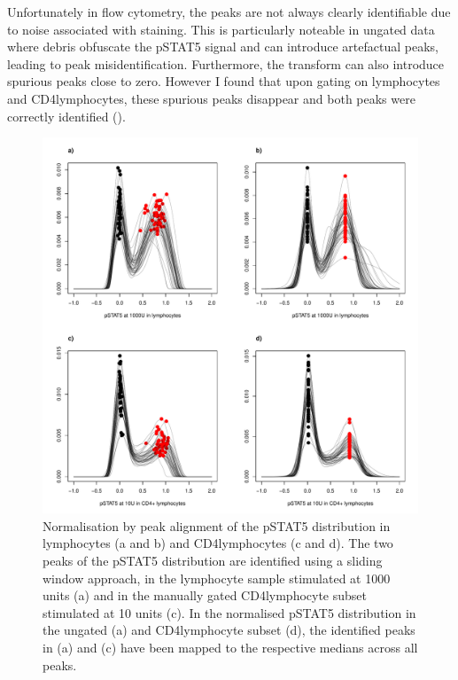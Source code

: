 Unfortunately in flow cytometry, the peaks are not always clearly identifiable due to noise associated with staining.
This is particularly noteable in ungated data where debris obfuscate the pSTAT5 signal and can introduce artefactual peaks, leading to peak misidentification.
Furthermore, the transform can also introduce spurious peaks close to zero.
However I found that upon gating on lymphocytes and CD4\positive lymphocytes, these spurious peaks disappear and both peaks were correctly identified 
().
\begin{figure}[h]
    \centering
    \includegraphics[scale=.5]{IL2/figures/pstat5-peak-normalisation.pdf}
    {Normalisation by peak alignment of the pSTAT5 distribution in lymphocytes (a and b) and CD4\positive lymphocytes (c and d).}
    {
      The two peaks of the pSTAT5 distribution are identified using a sliding window approach,
      in the lymphocyte sample stimulated at 1000 units (a) and in the manually gated CD4\positive lymphocyte subset stimulated at 10 units (c).
      In the normalised pSTAT5 distribution in the ungated (a) and CD4\positive lymphocyte subset (d),
      the identified peaks in (a) and (c) have been mapped to the respective medians across all peaks.
    }
\end{figure} 
